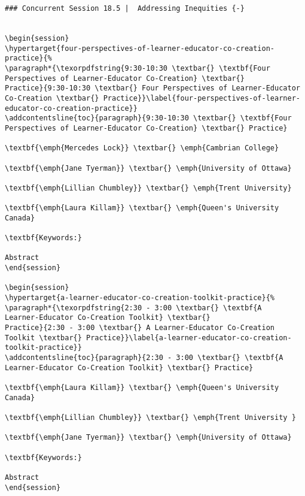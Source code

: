 \documentclass[
]{book}
\begin{document}
\begin{verbatim}
### Concurrent Session 18.5 |  Addressing Inequities {-}


\begin{session}
\hypertarget{four-perspectives-of-learner-educator-co-creation-practice}{%
\paragraph*{\texorpdfstring{9:30-10:30 \textbar{} \textbf{Four
Perspectives of Learner-Educator Co-Creation} \textbar{}
Practice}{9:30-10:30 \textbar{} Four Perspectives of Learner-Educator Co-Creation \textbar{} Practice}}\label{four-perspectives-of-learner-educator-co-creation-practice}}
\addcontentsline{toc}{paragraph}{9:30-10:30 \textbar{} \textbf{Four
Perspectives of Learner-Educator Co-Creation} \textbar{} Practice}

\textbf{\emph{Mercedes Lock}} \textbar{} \emph{Cambrian College}

\textbf{\emph{Jane Tyerman}} \textbar{} \emph{University of Ottawa}

\textbf{\emph{Lillian Chumbley}} \textbar{} \emph{Trent University}

\textbf{\emph{Laura Killam}} \textbar{} \emph{Queen's University Canada}

\textbf{Keywords:}

Abstract
\end{session}

\begin{session}
\hypertarget{a-learner-educator-co-creation-toolkit-practice}{%
\paragraph*{\texorpdfstring{2:30 - 3:00 \textbar{} \textbf{A
Learner-Educator Co-Creation Toolkit} \textbar{}
Practice}{2:30 - 3:00 \textbar{} A Learner-Educator Co-Creation Toolkit \textbar{} Practice}}\label{a-learner-educator-co-creation-toolkit-practice}}
\addcontentsline{toc}{paragraph}{2:30 - 3:00 \textbar{} \textbf{A
Learner-Educator Co-Creation Toolkit} \textbar{} Practice}

\textbf{\emph{Laura Killam}} \textbar{} \emph{Queen's University Canada}

\textbf{\emph{Lillian Chumbley}} \textbar{} \emph{Trent University }

\textbf{\emph{Jane Tyerman}} \textbar{} \emph{University of Ottawa}

\textbf{Keywords:}

Abstract
\end{session}


\end{verbatim}
\end{document}
